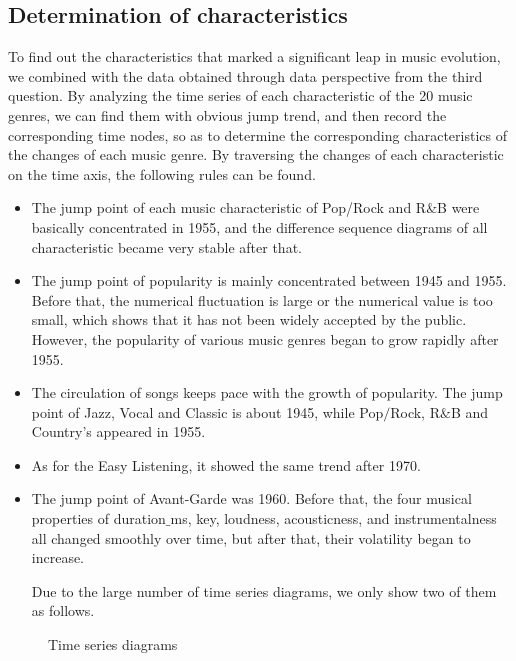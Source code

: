 \documentclass{mcmthesis}
\begin{document}
\subsection{Determination of characteristics}
 To find out the characteristics that marked a significant leap in music evolution, we combined with the data obtained through data perspective from the third question. By analyzing the time series of each characteristic of the 20 music genres, we can find them with obvious jump trend, and then record the corresponding time nodes, so as to determine the corresponding characteristics of the changes of each music genre. 
 By traversing the changes of each characteristic on the time axis, the following rules can be found.
 \begin{itemize}
 	\item The jump point of each music characteristic of Pop/Rock and R$\&$B were basically concentrated in 1955, and the difference sequence diagrams of all characteristic became very stable after that.
 	\item The jump point of popularity is mainly concentrated between 1945 and 1955. Before that, the numerical fluctuation is large or the numerical value is too small, which shows that it has not been widely accepted by the public. However, the popularity of various music genres began to grow rapidly after 1955.
 	\item The circulation of songs keeps pace with the growth of popularity. The jump point of Jazz, Vocal and Classic is about 1945, while Pop$/$Rock, R$\&$B and Country's appeared in 1955.
 	\item As for the Easy Listening, it showed the same trend after 1970.
 	\item The jump point of Avant-Garde was 1960. Before that, the four musical properties of duration$\_$ms, key, loudness, acousticness, and instrumentalness all changed smoothly over time, but after that, their volatility began to increase. 
 	
 
 Due to the large number of time series diagrams, we only show two of them as follows.
 \end{itemize}
\begin{figure}[H] %
	\centering  %
	\vspace{-0.35cm} %
	\subfigtopskip=2pt %
	\subfigbottomskip=2pt %
	\subfigcapskip=5pt %
	\quad %
	\caption{Time series diagrams}
	\label{level}
\end{figure}
\end{document}
